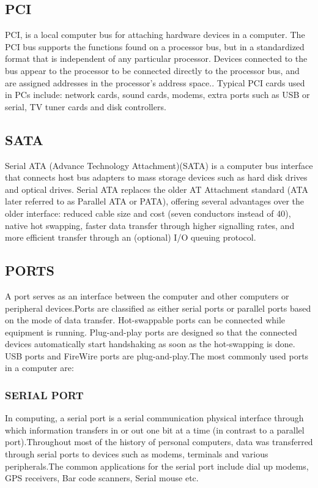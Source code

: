 			 \subsection*{PCI}
	  PCI, is a local computer bus for attaching hardware devices in a computer. The PCI bus supports the
	  functions found on a processor bus, but in a standardized format that is independent of any particular
	  processor. Devices connected to the bus appear to the processor to be connected directly to the processor
	  bus, and are assigned addresses in the processor's address space.. Typical PCI cards used in PCs include: network 			cards, sound
	  cards, modems, extra ports such as USB or serial, TV tuner cards and disk controllers.
  			\subsection*{SATA}
	   Serial ATA (Advance Technology Attachment)(SATA) is a computer bus interface that
	   connects host bus adapters to mass storage devices such as hard disk drives and optical drives. Serial ATA
	   replaces the older AT Attachment standard (ATA later referred to as Parallel ATA or PATA), offering
	   several advantages over the older interface: reduced cable size and cost (seven conductors instead of 40),
	   native hot swapping, faster data transfer through higher signalling rates, and more efficient transfer through
	   an (optional) I/O queuing protocol.
   		\subsection*{PORTS}
	   A port serves as an interface between the computer and other computers or peripheral devices.Ports are classified 		as either serial ports or parallel ports
	   based on the mode of data transfer. Hot-swappable ports can be connected while equipment is running. Plug-and-play 		ports are designed so that the connected
	   devices automatically start handshaking as soon as the hot-swapping is done. USB ports and FireWire ports are
	   plug-and-play.The most commonly used ports in a computer are:
		 \subsubsection*{SERIAL PORT}
	    In computing, a serial port is a serial communication physical interface through which
	    information transfers in or out one bit at a time (in contrast to a parallel port).Throughout most of the
	    history of personal computers, data was transferred through serial ports to devices such as modems,
	    terminals and various peripherals.The common applications for the serial port include
	    dial up modems, GPS receivers, Bar code scanners, Serial mouse etc.
